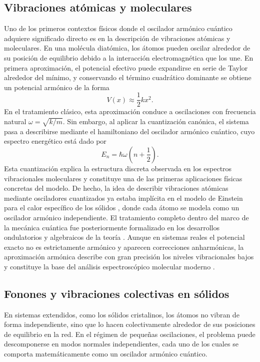 \subsection{Vibraciones atómicas y moleculares}
Uno de los primeros contextos físicos donde el oscilador armónico cuántico adquiere significado directo es en la descripción de vibraciones atómicas y moleculares. En una molécula diatómica, los átomos pueden oscilar alrededor de su posición de equilibrio debido a la interacción electromagnética que los une. En primera aproximación, el potencial efectivo puede expandirse en serie de Taylor alrededor del mínimo, y conservando el término cuadrático dominante se obtiene un potencial armónico de la forma
\vspace{-10pt}
\begin{equation}
V(x) \approx \frac{1}{2} k x^2.
\end{equation}
En el tratamiento clásico, esta aproximación conduce a oscilaciones con frecuencia natural $\omega = \sqrt{k/m}$. Sin embargo, al aplicar la cuantización canónica, el sistema pasa a describirse mediante el hamiltoniano del oscilador armónico cuántico, cuyo espectro energético está dado por
\vspace{-20pt}
\begin{equation}
E_n = \hbar \omega \left(n + \frac{1}{2}\right).
\end{equation}
Esta cuantización explica la estructura discreta observada en los espectros vibracionales moleculares y constituye una de las primeras aplicaciones físicas concretas del modelo. De hecho, la idea de describir vibraciones atómicas mediante osciladores cuantizados ya estaba implícita en el modelo de Einstein para el calor específico de los sólidos \citep{einstein1907}, donde cada átomo se modela como un oscilador armónico independiente. El tratamiento completo dentro del marco de la mecánica cuántica fue posteriormente formalizado en los desarrollos ondulatorios y algebraicos de la teoría \citep{schrodinger1926a, dirac1930}.
Aunque en sistemas reales el potencial exacto no es estrictamente armónico y aparecen correcciones anharmónicas, la aproximación armónica describe con gran precisión los niveles vibracionales bajos y constituye la base del análisis espectroscópico molecular moderno \citep{griffiths2018, cohen1977}.

\subsection{Fonones y vibraciones colectivas en sólidos}
En sistemas extendidos, como los sólidos cristalinos, los átomos no vibran de forma independiente, sino que lo hacen colectivamente alrededor de sus posiciones de equilibrio en la red. En el régimen de pequeñas oscilaciones, el problema puede descomponerse en modos normales independientes, cada uno de los cuales se comporta matemáticamente como un oscilador armónico cuántico.

